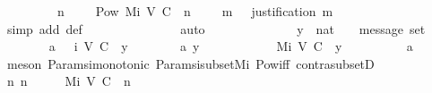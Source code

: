 \begin{isabellebody}
\ \ \ \ {\isachardoublequoteopen}{\isasymforall}\ {\isasymsigma}\ {\isasymin}\ {\isasymSigma}{\isachardot}\ {\isacharparenleft}{\isasymexists}\ n\ {\isasymin}\ {\isasymnat}{\isachardot}\ {\isasymsigma}\ {\isasymin}\ Pow\ {\isacharparenleft}Mi\ {\isacharparenleft}V{\isacharcomma}\ C{\isacharcomma}\ {\isasymepsilon}{\isacharparenright}\ {\isacharparenleft}n\ {\isacharminus}\ {}{\isacharparenright}{\isacharparenright}\ {\isasymand}\ {\isacharparenleft}{\isasymforall}\ m\ {\isasymin}\ {\isasymsigma}{\isachardot}\ justification\ m\ {\isasymsubseteq}\ {\isasymsigma}{\isacharparenright}{\isacharparenright}{\isachardoublequoteclose}\ \isanewline
%
\isadelimproof
\ \ \ \ %
\endisadelimproof
%
\isatagproof
{}\isamarkupfalse%
\ {\isacharparenleft}simp\ add{\isacharcolon}\ {\isasymSigma}{\isacharunderscore}def{\isacharparenright}\isanewline
\ \ \ \ \isanewline
\ \ \ \ \isanewline
\ \ \ \ \isamarkupfalse%
\ auto\isanewline
\ \ \ \ \isamarkupfalse%
\ {\isacharminus}\isanewline
\ \ \ \ \ \ \isamarkupfalse%
\ y\ {\isacharcolon}{\isacharcolon}\ nat\ \ {\isasymsigma}\ {\isacharcolon}{\isacharcolon}\ {\isachardoublequoteopen}message\ set{\isachardoublequoteclose}\isanewline
\ \ \ \ \ \ \isamarkupfalse%
\ a{}{\isacharcolon}\ {\isachardoublequoteopen}{\isasymsigma}\ {\isasymin}\ {\isasymSigma}i\ {\isacharparenleft}V{\isacharcomma}\ C{\isacharcomma}\ {\isasymepsilon}{\isacharparenright}\ y{\isachardoublequoteclose}\isanewline
\ \ \ \ \ \ \isamarkupfalse%
\ a{}{\isacharcolon}\ {\isachardoublequoteopen}y\ {\isasymin}\ {\isasymnat}{\isachardoublequoteclose}\isanewline
\ \ \ \ \ \ \isamarkupfalse%
\ {\isachardoublequoteopen}{\isasymsigma}\ {\isasymsubseteq}\ Mi\ {\isacharparenleft}V{\isacharcomma}\ C{\isacharcomma}\ {\isasymepsilon}{\isacharparenright}\ y{\isachardoublequoteclose}\isanewline
\ \ \ \ \ \ \ \ \isamarkupfalse%
\ a{}\ \isamarkupfalse%
\ {\isacharparenleft}meson\ Params{\isachardot}{\isasymSigma}i{\isacharunderscore}monotonic\ Params{\isachardot}{\isasymSigma}i{\isacharunderscore}subset{\isacharunderscore}Mi\ Pow{\isacharunderscore}iff\ contra{\isacharunderscore}subsetD{\isacharparenright}\isanewline
\ \ \ \ \ \ \isamarkupfalse%
\ \isamarkupfalse%
\ {\isachardoublequoteopen}{\isasymexists}n{\isachardot}\ n\ {\isasymin}\ {\isasymnat}\ {\isasymand}\ {\isasymsigma}\ {\isasymsubseteq}\ Mi\ {\isacharparenleft}V{\isacharcomma}\ C{\isacharcomma}\ {\isasymepsilon}{\isacharparenright}\ {\isacharparenleft}n\ {\isacharminus}\ {}{\isacharparenright}{\isachardoublequoteclose}\isanewline

\end{isabellebody}
